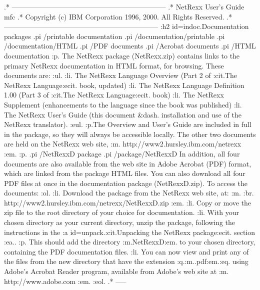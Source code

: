 .* ------------------------------------------------------------------
.* NetRexx User's Guide                                              mfc
.* Copyright (c) IBM Corporation 1996, 2000.  All Rights Reserved.
.* ------------------------------------------------------------------
:h2 id=indoc.Documentation packages
.pi /printable documentation
.pi /documentation/printable
.pi /documentation/HTML
.pi /PDF documents
.pi /Acrobat documents
.pi /HTML documentation
:p.
The NetRexx package (NetRexx.zip) contains links to the primary NetRexx
documentation in HTML format, for browsing.
These documents are:
:ul.
:li.
The NetRexx Language Overview (Part 2 of :cit.The NetRexx
Language:ecit. book, updated)
:li.
The NetRexx Language Definition 1.00 (Part 3 of :cit.The NetRexx
Language:ecit. book)
:li.
The NetRexx Supplement (enhancements to the language since the book
was published)
:li.
The NetRexx User's Guide (this document &dash. installation and use of
the NetRexx translator).
:eul.
:p.The Overview and User's Guide are included in full in the package, so
they will always be accessible locally.  The other two documents are
held on the NetRexx web site, :m.
http://www2.hursley.ibm.com/netrexx
:em.
:p.
.pi /NetRexxD package
.pi /package/NetRexxD
In addition, all four documents are also available from the web site in
Adobe Acrobat (PDF) format, which are linked from the package HTML files.
You can also download all four PDF files at once in the documentation
package (NetRexxD.zip).  To access the documents:
:ol.
:li.
Download the package from the NetRexx web site, at: :m.
:br.
http://www2.hursley.ibm.com/netrexx/NetRexxD.zip
:em.
:li.
Copy or move the zip file to the root directory of your choice for
documentation.
:li.
With your chosen directory as your current directory, unzip the
package, following the instructions in the :a id=unpack.:cit.Unpacking
the NetRexx package:ecit. section :ea..
:p.
This should add the directory :m.NetRexxD:em. to your chosen directory,
containing the PDF documentation files.
:li.
You can now view and print any of the files from the new directory that
have the extension :q.:m..pdf:em.:eq. using Adobe's Acrobat Reader
program, available from Adobe's web site at :m.
http://www.adobe.com
:em.
:eol.
.* -----
